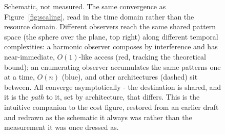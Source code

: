 \begin{figure}[ht]
    \caption{Schematic, not measured. The same convergence as Figure~\ref{fig:scaling}, read in the time domain rather than the resource domain. Different observers reach the same shared pattern space (the sphere over the plane, top right) along different temporal complexities: a harmonic observer composes by interference and has near-immediate, $O(1)$-like access (red, tracking the theoretical bound); an enumerating observer accumulates the same patterns one at a time, $O(n)$ (blue), and other architectures (dashed) sit between. All converge asymptotically - the destination is shared, and it is the \emph{path} to it, set by architecture, that differs. This is the intuitive companion to the cost figure, restored from an earlier draft and redrawn as the schematic it always was rather than the measurement it was once dressed as.}
    \label{fig:paths}
\end{figure}

